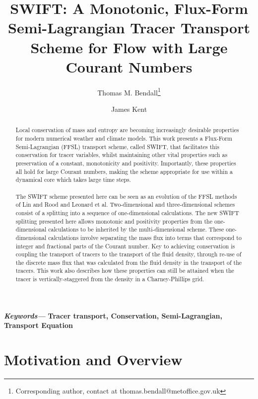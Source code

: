 \documentclass[11pt,a4paper]{article}
\title{SWIFT: A Monotonic, Flux-Form Semi-Lagrangian Tracer Transport Scheme for Flow with Large Courant Numbers}
\author[1]{Thomas M. Bendall\thanks{Corresponding author, contact at thomas.bendall@metoffice.gov.uk}}
\author[1]{James Kent}
\affil[1]{Dynamics Research, Met Office, Exeter, UK}
\date{}
\providecommand{\keywords}[1]
{
  \small	
  \textbf{\textit{Keywords---}} #1
}
\begin{document}
\maketitle

\begin{abstract}
\noindent
Local conservation of mass and entropy are becoming increasingly desirable properties for modern numerical weather and climate models.
This work presents a Flux-Form Semi-Lagrangian (FFSL) transport scheme, called SWIFT, that facilitates this conservation for tracer variables, whilst maintaining other vital properties such as preservation of a constant, monotonicity and positivity.
Importantly, these properties all hold for large Courant numbers, making the scheme appropriate for use within a dynamical core which takes large time steps. \\
\\
The SWIFT scheme presented here can be seen as an evolution of the FFSL methods of Lin and Rood and Leonard et al.
Two-dimensional and three-dimensional schemes consist of a splitting into a sequence of one-dimensional calculations.
The new SWIFT splitting presented here allows monotonic and positivity properties from the one-dimensional calculations to be inherited by the multi-dimensional scheme.
These one-dimensional calculations involve separating the mass flux into terms that correspond to integer and fractional parts of the Courant number.
Key to achieving conservation is coupling the transport of tracers to the transport of the fluid density, through re-use of the discrete mass flux that was calculated from the fluid density in the transport of the tracers.
This work also describes how these properties can still be attained when the tracer is vertically-staggered from the density in a Charney-Phillips grid.


\end{abstract}
\keywords{\textbf{Tracer transport, Conservation, Semi-Lagrangian, Transport Equation}}

\section{Motivation and Overview} \label{sec:intro}
\end{document}
